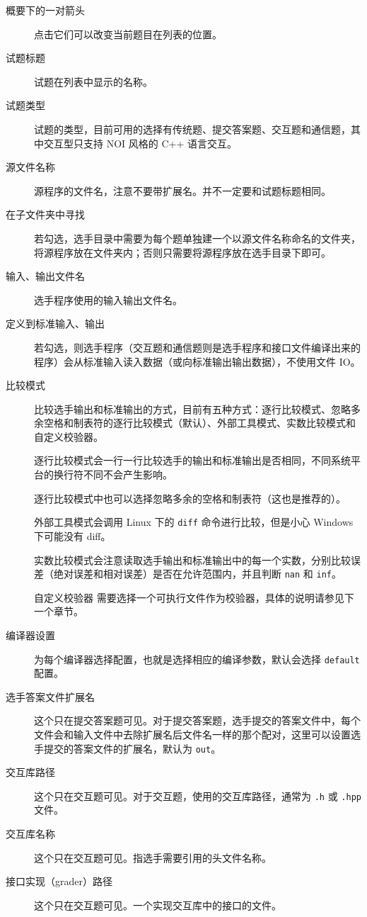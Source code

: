 \documentclass[UTF-8]{ctexart}
\begin{document}
			\begin{description}
				\item[概要下的一对箭头] 点击它们可以改变当前题目在列表的位置。
				\item[试题标题] 试题在列表中显示的名称。
				\item[试题类型] 试题的类型，目前可用的选择有传统题、提交答案题、交互题和通信题，其中交互型只支持 NOI 风格的 C++ 语言交互。
				\item[源文件名称] 源程序的文件名，注意不要带扩展名。并不一定要和试题标题相同。
				\item[在子文件夹中寻找] 若勾选，选手目录中需要为每个题单独建一个以源文件名称命名的文件夹，将源程序放在文件夹内；否则只需要将源程序放在选手目录下即可。
				\item[输入、输出文件名] 选手程序使用的输入输出文件名。
				\item[定义到标准输入、输出] 若勾选，则选手程序（交互题和通信题则是选手程序和接口文件编译出来的程序）会从标准输入读入数据（或向标准输出输出数据），不使用文件 IO。
				\item[比较模式] 比较选手输出和标准输出的方式，目前有五种方式：逐行比较模式、忽略多余空格和制表符的逐行比较模式（默认）、外部工具模式、实数比较模式和自定义校验器。

				逐行比较模式会一行一行比较选手的输出和标准输出是否相同，不同系统平台的换行符不同不会产生影响。

				逐行比较模式中也可以选择忽略多余的空格和制表符（这也是推荐的）。

				外部工具模式会调用 Linux 下的 \texttt{diff} 命令进行比较，但是小心 Windows 下可能没有 diff。

				实数比较模式会注意读取选手输出和标准输出中的每一个实数，分别比较误差（绝对误差和相对误差）是否在允许范围内，并且判断 \texttt{nan} 和 \texttt{inf}。

				自定义校验器 需要选择一个可执行文件作为校验器，具体的说明请参见下一个章节。
				\item[编译器设置] 为每个编译器选择配置，也就是选择相应的编译参数，默认会选择 \texttt{default} 配置。

				\item[选手答案文件扩展名] 这个只在提交答案题可见。对于提交答案题，选手提交的答案文件中，每个文件会和输入文件中去除扩展名后文件名一样的那个配对，这里可以设置选手提交的答案文件的扩展名，默认为 \texttt{out}。

				\item[交互库路径] 这个只在交互题可见。对于交互题，使用的交互库路径，通常为 \texttt{.h} 或 \texttt{.hpp} 文件。
				\item[交互库名称] 这个只在交互题可见。指选手需要引用的头文件名称。
				\item[接口实现（grader）路径] 这个只在交互题可见。一个实现交互库中的接口的文件。


\end{description}
\end{document}
